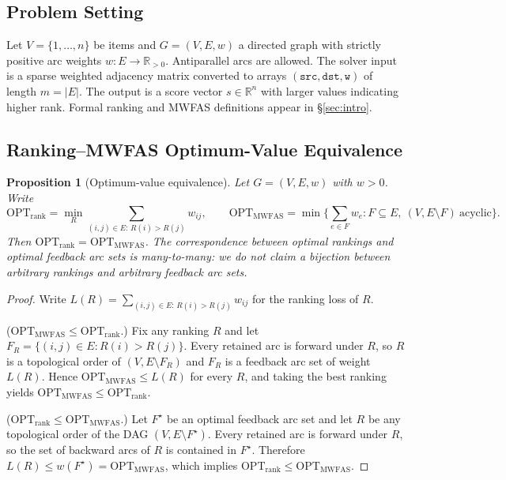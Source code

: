 \documentclass{article}
\newtheorem{proposition}{Proposition}
\begin{document}
\subsection{Problem Setting}
\label{subsec:framework_problem}
Let $V=\{1,\dots,n\}$ be items and $G=(V,E,w)$ a directed graph with strictly positive arc weights $w:E\to\mathbb{R}_{>0}$. Antiparallel arcs are allowed. The solver input is a sparse weighted adjacency matrix converted to arrays $(\texttt{src},\texttt{dst},\texttt{w})$ of length $m=|E|$. The output is a score vector $s\in\mathbb{R}^n$ with larger values indicating higher rank. Formal ranking and MWFAS definitions appear in \S\ref{sec:intro}.

\subsection{Ranking--MWFAS Optimum-Value Equivalence}
\label{subsec:theory_equivalence}

\begin{proposition}[Optimum-value equivalence]
\label{prop:rank_mwfas}
Let $G=(V,E,w)$ with $w>0$. Write
\[
\mathrm{OPT}_{\mathrm{rank}}
=
\min_{R}\sum_{(i,j)\in E:\,R(i)>R(j)} w_{ij},
\qquad
\mathrm{OPT}_{\mathrm{MWFAS}}
=
\min\bigl\{\textstyle\sum_{e\in F}w_e : F\subseteq E,\ (V,E\setminus F)\ \text{acyclic}\bigr\}.
\]
Then $\mathrm{OPT}_{\mathrm{rank}}=\mathrm{OPT}_{\mathrm{MWFAS}}$.
The correspondence between optimal rankings and optimal feedback arc sets is many-to-many: we do \emph{not} claim a bijection between arbitrary rankings and arbitrary feedback arc sets.
\end{proposition}

\begin{proof}
Write $L(R)=\sum_{(i,j)\in E:\,R(i)>R(j)} w_{ij}$ for the ranking loss of $R$.

($\mathrm{OPT}_{\mathrm{MWFAS}}\le\mathrm{OPT}_{\mathrm{rank}}$.)
Fix any ranking $R$ and let $F_R=\{(i,j)\in E:R(i)>R(j)\}$. Every retained arc is forward under $R$, so $R$ is a topological order of $(V,E\setminus F_R)$ and $F_R$ is a feedback arc set of weight $L(R)$. Hence $\mathrm{OPT}_{\mathrm{MWFAS}}\le L(R)$ for every $R$, and taking the best ranking yields $\mathrm{OPT}_{\mathrm{MWFAS}}\le\mathrm{OPT}_{\mathrm{rank}}$.

($\mathrm{OPT}_{\mathrm{rank}}\le\mathrm{OPT}_{\mathrm{MWFAS}}$.)
Let $F^\star$ be an optimal feedback arc set and let $R$ be any topological order of the DAG $(V,E\setminus F^\star)$. Every retained arc is forward under $R$, so the set of backward arcs of $R$ is contained in $F^\star$. Therefore $L(R)\le w(F^\star)=\mathrm{OPT}_{\mathrm{MWFAS}}$, which implies $\mathrm{OPT}_{\mathrm{rank}}\le\mathrm{OPT}_{\mathrm{MWFAS}}$.
\end{proof}
\end{document}
